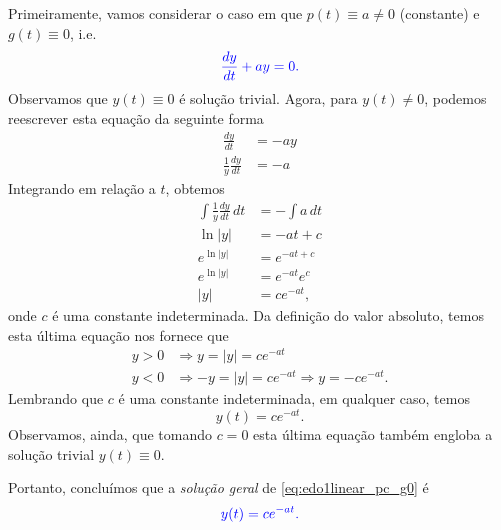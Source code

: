 Primeiramente, vamos considerar o caso em que $p(t) \equiv a \neq 0$ (constante) e $g(t) \equiv 0$, i.e.
\begin{equation}\label{eq:edo1linear_pc_g0}
  \color{blue}{\frac{dy}{dt} + ay = 0.}
\end{equation}
Observamos que $y(t)\equiv 0$ é solução trivial. Agora, para $y(t)\neq 0$, podemos reescrever esta equação da seguinte forma
\begin{align}
  \frac{dy}{dt} &= -ay \\
  \frac{1}{y}\frac{dy}{dt} &= -a
\end{align}
Integrando em relação a $t$, obtemos
\begin{align}
  \int \frac{1}{y}\frac{dy}{dt}\,dt &= -\int a\,dt \\
  \ln|y| &= -at + c \\
  e^{\ln|y|} &= e^{-at + c} \\
  e^{\ln|y|} &= e^{-at}e^c \\
  |y| &= ce^{-at},
\end{align}
onde $c$ é uma constante indeterminada. Da definição do valor absoluto, temos esta última equação nos fornece que
\begin{align}
  y>0 &\Rightarrow y = |y| = ce^{-at}\\
  y<0 &\Rightarrow -y = |y| = ce^{-at}\Rightarrow y=-ce^{-at}.
\end{align}
Lembrando que $c$ é uma constante indeterminada, em qualquer caso, temos
\begin{equation}
  y(t) = ce^{-at}.
\end{equation}
Observamos, ainda, que tomando $c=0$ esta última equação também engloba a solução trivial $y(t)\equiv 0$.

Portanto, concluímos que a \emph{solução geral} de \eqref{eq:edo1linear_pc_g0} é
\begin{equation}
  \color{blue}{y(t) = ce^{-at}.}
\end{equation}


